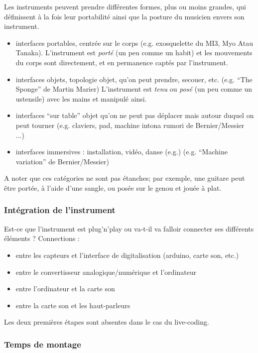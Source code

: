 Les instruments peuvent prendre différentes formes, plus ou moins grandes, qui définissent à la fois leur portabilité ainsi que la posture du musicien envers son instrument.
\vspace{-1em}
\begin{itemize}[noitemsep]
	\item interfaces portables, centrée sur le corps (e.g. exosquelette du MI3, Myo Atau Tanaka). L'instrument est \textit{porté} (un peu comme un habit) et les mouvements du corps sont directement, et en permanence captés par l'instrument.
	\item interfaces objets, topologie objet, qu'on peut prendre, secouer, etc. (e.g. ``The Sponge'' de Martin Marier) L'instrument est \textit{tenu} ou \textit{posé} (un peu comme un ustensile) avec les mains et manipulé ainsi.
	\item interfaces ``sur table'' objet qu'on ne peut pas déplacer mais autour duquel on peut tourner (e.g. claviers, pad, machine intona rumori de Bernier/Messier ...)
	\item interfaces immersives : installation, vidéo, danse (e.g.) (e.g. ``Machine variation'' de Bernier/Messier)
\end{itemize}

A noter que ces catégories ne sont pas étanches; par exemple, une guitare peut être portée, à l'aide d'une sangle, ou posée sur le genou et jouée à plat. 

\subsubsection{Intégration de l'instrument}

Est-ce que l'instrument est plug'n'play ou va-t-il va falloir connecter ses différents éléments ? Connections : 
\vspace{-1em}
\begin{itemize}[noitemsep]
	\item entre les capteurs et l'interface de digitalisation (arduino, carte son, etc.)
	\item entre le convertisseur analogique/numérique et l'ordinateur
	\item entre l'ordinateur et la carte son
	\item entre la carte son et les haut-parleurs
\end{itemize}

Les deux premières étapes sont absentes dans le cas du live-coding.


\subsubsection{Temps de montage}

